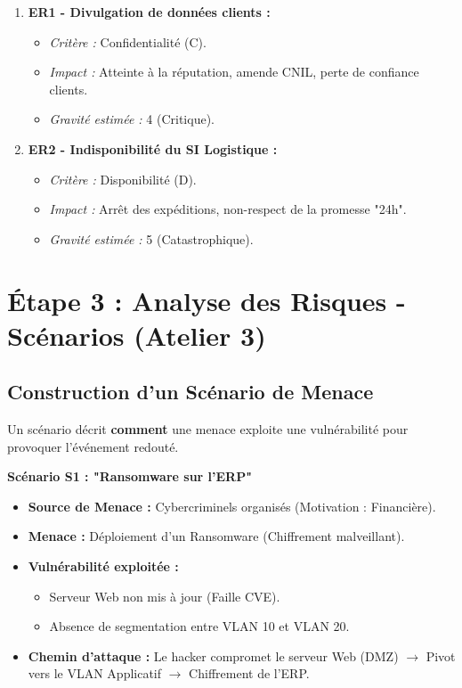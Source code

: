 \begin{enumerate}
    \item \textbf{ER1 - Divulgation de données clients :}
    \begin{itemize}
        \item \textit{Critère :} Confidentialité (C).
        \item \textit{Impact :} Atteinte à la réputation, amende CNIL, perte de confiance clients.
        \item \textit{Gravité estimée :} 4 (Critique).
    \end{itemize}
    
    \item \textbf{ER2 - Indisponibilité du SI Logistique :}
    \begin{itemize}
        \item \textit{Critère :} Disponibilité (D).
        \item \textit{Impact :} Arrêt des expéditions, non-respect de la promesse "24h".
        \item \textit{Gravité estimée :} 5 (Catastrophique).
    \end{itemize}
\end{enumerate}

\section{Étape 3 : Analyse des Risques - Scénarios (Atelier 3)}

\subsection{Construction d'un Scénario de Menace}

Un scénario décrit \textbf{comment} une menace exploite une vulnérabilité pour provoquer l'événement redouté.

\begin{boxlizbiz}
\textbf{Scénario S1 : "Ransomware sur l'ERP"}
\begin{itemize}
    \item \textbf{Source de Menace :} Cybercriminels organisés (Motivation : Financière).
    \item \textbf{Menace :} Déploiement d'un Ransomware (Chiffrement malveillant).
    \item \textbf{Vulnérabilité exploitée :} 
    \begin{itemize}
        \item Serveur Web non mis à jour (Faille CVE).
        \item Absence de segmentation entre VLAN 10 et VLAN 20.
    \end{itemize}
    \item \textbf{Chemin d'attaque :} Le hacker compromet le serveur Web (DMZ) $\rightarrow$ Pivot vers le VLAN Applicatif $\rightarrow$ Chiffrement de l'ERP.
\end{itemize}
\end{boxlizbiz}

